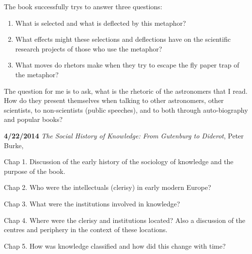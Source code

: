 The book successfully trys to answer three questions:
\begin{enumerate}
  \item What is selected and what is deflected by this metaphor?
  \item What effects might these selections and deflections have on the
scientific research projects of those who use the metaphor?
  \item What moves do rhetors make when they try to escape the fly
paper trap of the metaphor?
\end{enumerate}

The question for me is to ask, what is the rhetoric of the astronomers
that I read.  How do they present themselves when talking to other
astronomers, other scientists, to non-scientists (public speeches),
and to both through auto-biography and popular books?


{\bf 4/22/2014}
{\it The Social History of Knowledge: From Gutenburg to Diderot},
Peter Burke, \cite{burke:2000}

Chap 1. Discussion of the early history of the sociology of knowledge
and the purpose of the book.

Chap 2. Who were the intellectuals (clerisy) in early modern Europe?

Chap 3. What were the institutions involved in knowledge?

Chap 4. Where were the clerisy and institutions located? Also a discussion
of the centres and periphery in the context of these locations.

Chap 5. How was knowledge classified and how did this change with time?
